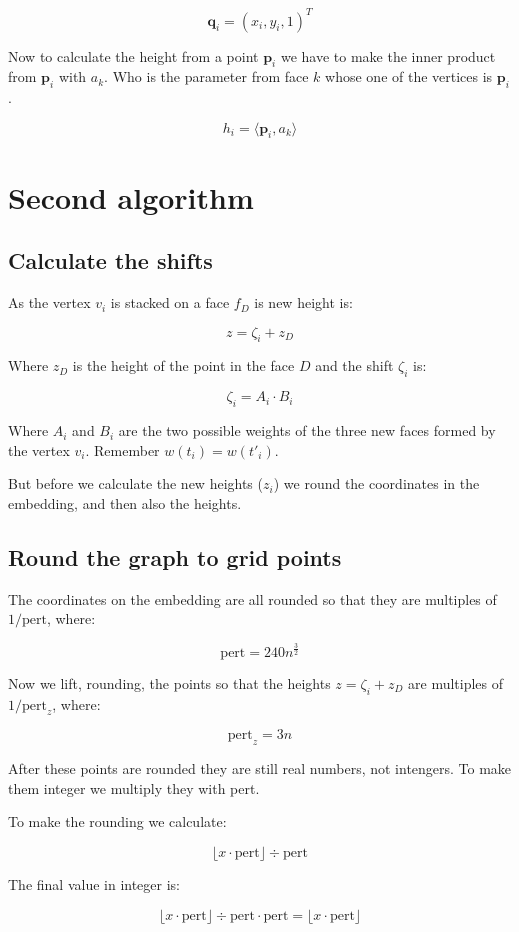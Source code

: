 \documentclass[10pt,a4paper]{article}
\begin{document}
$$\mathbf{q}_i = (x_i,y_i,1)^T$$

Now to calculate the height from a point $\mathbf{p}_i$ we have to make the inner product from $\mathbf{p}_i$ with $a_k$. Who is the parameter from face $k$ whose one of the vertices is $\mathbf{p}_i$.

$$h_i = \langle \mathbf{p}_i, a_k\rangle$$

\section{Second algorithm}

\subsection{Calculate the shifts} 

As the vertex $v_i$ is stacked on a face $f_D$ is new height is:

$$z= \zeta_i + z_D $$

Where $z_D$ is the height of the point in the face $D$ and the shift $\zeta_i$ is:

$$\zeta_i = A_i\cdot B_i$$

Where  $ A_i$ and $B_i$ are the two possible weights of the three new faces formed by the vertex $v_i$. Remember $w(t_i)= w(t'_i) $.

But before we calculate the new heights ($z_i$) we round the coordinates in the embedding, and then also the heights.

\subsection{Round the graph to grid points}

The coordinates on the embedding are all rounded so that they are multiples of $1/\text{pert}$, where:

$$\text{pert}=240n^{\frac{3}{2}}$$

Now we lift, rounding, the points so that the heights $z= \zeta_i + z_D $ are multiples of $1/\text{pert}_z$, where: 

$$\text{pert}_z=3n$$ 

After these points are rounded they are still real numbers, not intengers. To make them integer we multiply they with pert.

To make the rounding we calculate:

$$\lfloor x\cdot\text{pert}\rfloor \div \text{pert}$$

The final value in integer is:

$$\lfloor x\cdot\text{pert}\rfloor \div \text{pert} \cdot\text{pert} = \lfloor x\cdot\text{pert}\rfloor$$
\end{document}

